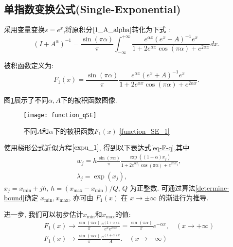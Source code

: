 \subsection{单指数变换公式(Single-Exponential)}
采用变量变换\(s=e^{x}\),将原积分$\eqref{1_A_alpha}$转化为下式 \cite{Harizanov2020ASO}:
\begin{equation}\label{expu_1}
	(I+{A}^{\alpha})^{-1}=\frac{\sin(\pi \alpha)}{\pi}\int_{-\infty}^{+\infty}\frac{e^{\alpha x}(e^{ x}+A)^{-1} e^{ x}}{1+2e^{\alpha x}\cos(\pi\alpha)+e^{2\alpha x}} dx.
\end{equation}

被积函数定义为: 
\begin{equation}
	F_1(x)=\frac{\sin(\pi \alpha)}{\pi} \frac{e^{\alpha x}(e^{ x} +A)^{-1} e^{ x}}{1+2e^{\alpha x}\cos(\pi\alpha)+e^{2\alpha x}}.
	\label{function_SE_1}
\end{equation}

图\ref{pfunction_SE_1}展示了不同\(\alpha,A\)下的被积函数图像.
\begin{figure}[htbp]
	\centering
	\texttt{[image: function\_qSE]}
	\caption{不同$A$和$\alpha$下的被积函数$F_1(x)$ \eqref{function_SE_1}}
	\label{pfunction_SE_1}
\end{figure}

使用梯形公式近似方程$\eqref{expu_1}$, 得到以下表达式\eqref{eq-F-q},其中
\begin{equation}
	\begin{aligned}
		&w_j=h\frac{\sin(\pi \alpha)}{\pi}\frac{ \exp((1+\alpha) x_j)}{1+2e^{\alpha  x_j}\cos(\pi\alpha)+e^{2\alpha  x_j}},\\
		&\lambda_j=\exp( x_j),
	\end{aligned}
	\label{lw_SE_q1}
\end{equation}
$x_j=x_{\min}+jh$, $h=(x_{\max}-x_{\min})/Q$, $Q$ 为正整数. 可通过算法\ref{determine-bound}确定 $x_{\min}, x_{\max}$, 亦可由 $F_1(x)$ 在 $x\to\pm\infty$ 的渐进行为推导. 

进一步, 我们可以初步估计$x_{\min}$和$x_{\max}$的值: 
\begin{equation}\label{AS_SE}
	\begin{aligned}
		& F_1(x)\rightarrow \frac{\sin(\pi \alpha)}{\pi} \frac{ e^{(1+\alpha) x}}{e^{ x}e^{2\alpha x}}= \frac{\sin(\pi \alpha)}{\pi} e^{-\alpha  x}, \quad (x \rightarrow +\infty)\\
		& F_1(x)\rightarrow \frac{\sin(\pi \alpha)}{\pi} \frac{ e^{(1+\alpha) x}}{A}. \quad (x \rightarrow -\infty)
	\end{aligned}
\end{equation}

